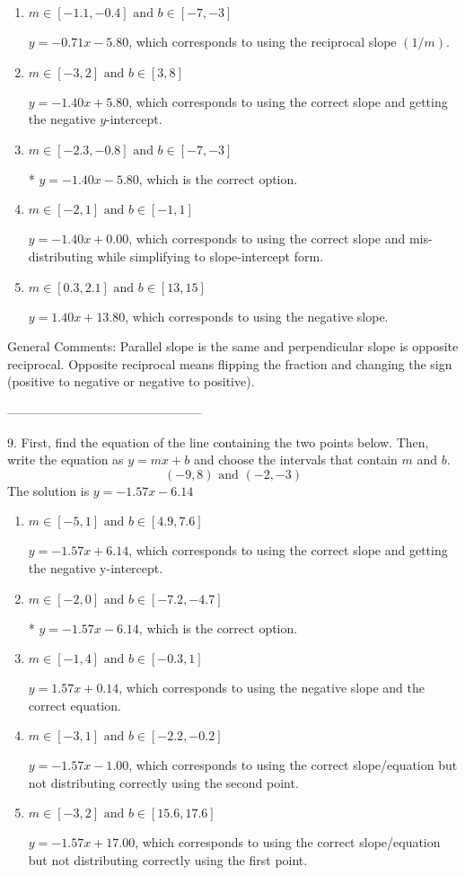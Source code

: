 \documentclass{extbook}[14pt]
\begin{document}
\begin{enumerate}[label=\Alph*.] 
\item $ m \in [-1.1, -0.4] \text{ and } b \in [-7, -3] $ 

  $y = -0.71x - 5.80$, which corresponds to using the reciprocal slope $(1/m)$. 
\item $ m \in [-3, 2] \text{ and } b \in [3, 8] $ 

  $y = -1.40x + 5.80$, which corresponds to using the correct slope and getting the negative $y$-intercept. 
\item $ m \in [-2.3, -0.8] \text{ and } b \in [-7, -3] $ 

 * $y = -1.40x - 5.80$, which is the correct option. 
\item $ m \in [-2, 1] \text{ and } b \in [-1, 1] $ 

  $y = -1.40x + 0.00$, which corresponds to using the correct slope and mis-distributing while simplifying to slope-intercept form. 
\item $ m \in [0.3, 2.1] \text{ and } b \in [13, 15] $ 

  $y = 1.40x + 13.80$, which corresponds to using the negative slope. 
\end{enumerate} 
 
General Comments: Parallel slope is the same and perpendicular slope is opposite reciprocal. Opposite reciprocal means flipping the fraction and changing the sign (positive to negative or negative to positive).

-----------------------------------------------

9. First, find the equation of the line containing the two points below. Then, write the equation as $ y=mx+b $ and choose the intervals that contain $m$ and $b$.
\[ (-9, 8) \text{ and } (-2, -3) \] 
The solution is $ y = -1.57x - 6.14 $ 

\begin{enumerate}[label=\Alph*.] 
\item $ m \in [-5, 1] \text{ and } b \in [4.9, 7.6] $ 

  $y = -1.57x + 6.14$, which corresponds to using the correct slope and getting the negative y-intercept. 
\item $ m \in [-2, 0] \text{ and } b \in [-7.2, -4.7] $ 

 * $y = -1.57x - 6.14$, which is the correct option. 
\item $ m \in [-1, 4] \text{ and } b \in [-0.3, 1] $ 

  $y = 1.57x + 0.14$, which corresponds to using the negative slope and the correct equation. 
\item $ m \in [-3, 1] \text{ and } b \in [-2.2, -0.2] $ 

  $y = -1.57x - 1.00$, which corresponds to using the correct slope/equation but not distributing correctly using the second point. 
\item $ m \in [-3, 2] \text{ and } b \in [15.6, 17.6] $ 

  $y = -1.57x + 17.00$, which corresponds to using the correct slope/equation but not distributing correctly using the first point. 
\end{enumerate} 
 
\end{document}
